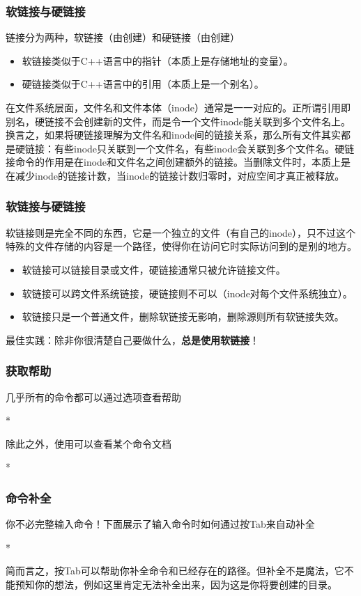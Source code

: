 \begin{frame}
    \frametitle{软链接与硬链接}
    链接分为两种，软链接（由创建）和硬链接（由创建）
    \begin{itemize}
        \item 软链接类似于C++语言中的指针（本质上是存储地址的变量）。
        \item 硬链接类似于C++语言中的引用（本质上是一个别名）。
    \end{itemize}
    在文件系统层面，文件名和文件本体（inode）通常是一一对应的。正所谓引用即别名，硬链接不会创建新的文件，而是令一个文件inode能关联到多个文件名上。换言之，如果将硬链接理解为文件名和inode间的链接关系，那么所有文件其实都是硬链接：有些inode只关联到一个文件名，有些inode会关联到多个文件名。硬链接命令的作用是在inode和文件名之间创建额外的链接。当删除文件时，本质上是在减少inode的链接计数，当inode的链接计数归零时，对应空间才真正被释放。
\end{frame}

\begin{frame}
    \frametitle{软链接与硬链接}
    软链接则是完全不同的东西，它是一个独立的文件（有自己的inode），只不过这个特殊的文件存储的内容是一个路径，使得你在访问它时实际访问到的是别的地方。
    \begin{itemize}
        \item 软链接可以链接目录或文件，硬链接通常只被允许链接文件。
        \item 软链接可以跨文件系统链接，硬链接则不可以（inode对每个文件系统独立）。
        \item 软链接只是一个普通文件，删除软链接无影响，删除源则所有软链接失效。
    \end{itemize}
    最佳实践：除非你很清楚自己要做什么，\textbf{总是使用软链接}！
\end{frame}

\begin{frame}
    \frametitle{获取帮助}
    几乎所有的命令都可以通过选项查看帮助
    \begin{Code}*
        
    \end{Code}
    除此之外，使用可以查看某个命令文档
    \begin{Code}*
        
    \end{Code}
\end{frame}

\begin{frame}
    \frametitle{命令补全}
    你不必完整输入命令！下面展示了输入命令时如何通过按Tab来自动补全
    \begin{Code}*
        
    \end{Code}
    简而言之，按Tab可以帮助你补全命令和已经存在的路径。但补全不是魔法，它不能预知你的想法，例如这里肯定无法补全出来，因为这是你将要创建的目录。
\end{frame}

